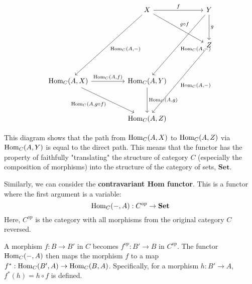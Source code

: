 \documentclass[uplatex,a4j,12pt,dvipdfmx]{jsarticle}
\begin{document}
\[
	\begin{tikzcd}
		&  & X \arrow[rr, "f"] \arrow[rrdd, "g \circ f"] \arrow[lldddd, "{{\rm Hom}_{C}(A, -)}"] &  & Y \arrow[lldddd, "{{\rm Hom}_{C}(A, -)}"] \arrow[dd, "g"] \\
		&  &                                  &  &                                \\
		&  &                                  &  & Z \arrow[lldddd, "{{\rm Hom}_{C}(A, -)}"]          \\
		&  &                                  &  &                                \\
		{{\rm Hom}_{C}(A,X)} \arrow[rr, "{{\rm Hom}_{C}(A, f)}"] \arrow[rrdd, "{{\rm Hom}_{C}(A, g \circ f)}"'] &  & {{\rm Hom}_{C}(A, Y)} \arrow[dd, "{{\rm Hom}_{C}(A, g)}"]          &  &                                \\
		&  &                                  &  &                                \\
		&  & {{\rm Hom}_{C}(A, Z)}                             &  &
	\end{tikzcd}
\]

This diagram shows that the path from ${\rm Hom}_{C}(A,X)$ to ${\rm Hom}_{C}(A,Z)$ via ${\rm Hom}_{C}(A,Y)$ is equal to the direct path.
This means that the functor has the property of faithfully "translating" the structure of category $C$ (especially the composition of morphisms) into the structure of the category of sets, $\mathbf{Set}$.

Similarly, we can consider the \textbf{contravariant Hom functor}.
This is a functor where the first argument is a variable:
$$
	{\rm Hom}_{C}(-,A) : C^{op} \to \mathbf{Set}
$$
Here, $C^{op}$ is the category with all morphisms from the original category $C$ reversed.

A morphism $f : B \to B'$ in $C$ becomes $f^{op} : B' \to B$ in $C^{op}$. The functor ${\rm Hom}_{C}(-,A)$ then maps the morphism $f$ to a map
$f^* : {\rm Hom}_{C}(B',A) \to {\rm Hom}_{C}(B,A)$.
Specifically, for a morphism $h: B' \to A$,
$f^*(h) = h \circ f$
is defined.
\end{document}
